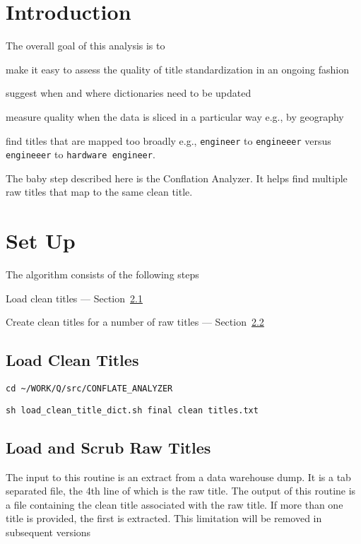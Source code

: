 
\section{Introduction}

The overall goal of this analysis is to 
\be
\item make it easy to assess the quality of title standardization in an
ongoing fashion
\item suggest when and where dictionaries need to be updated
\item measure quality when the data is sliced in a particular way e.g.,
  by geography
\item find titles that are mapped too broadly e.g., {\tt engineer} to
  {\tt engineeer} versus {\tt engineeer} to {\tt hardware engineer}.
\ee

The baby step described here is the Conflation Analyzer. 
It helps find multiple raw titles that map to the same clean title.

\section{Set Up}

The algorithm consists of the following steps
\be
\item Load clean titles --- Section~\ref{load_clean_titles}
\item Create clean titles for a number of raw titles ---
Section~\ref{load_and_scrub_raw_titles}
\ee


\subsection{Load Clean Titles}
\label{load_clean_titles}

\bi
\item \verb+cd ~/WORK/Q/src/CONFLATE_ANALYZER+
\item \verb+sh load_clean_title_dict.sh final clean titles.txt+
\ei

\subsection{Load and Scrub Raw Titles}
\label{load_and_scrub_raw_titles}

The input to this routine is an extract from a data warehouse dump. It
is a tab separated file, the 4th line of which is the raw title. 
The output of this routine is a file containing the clean title
associated with the raw title. If more than one title is provided, the
first is extracted. This limitation will be removed in subsequent
versions \TBC

